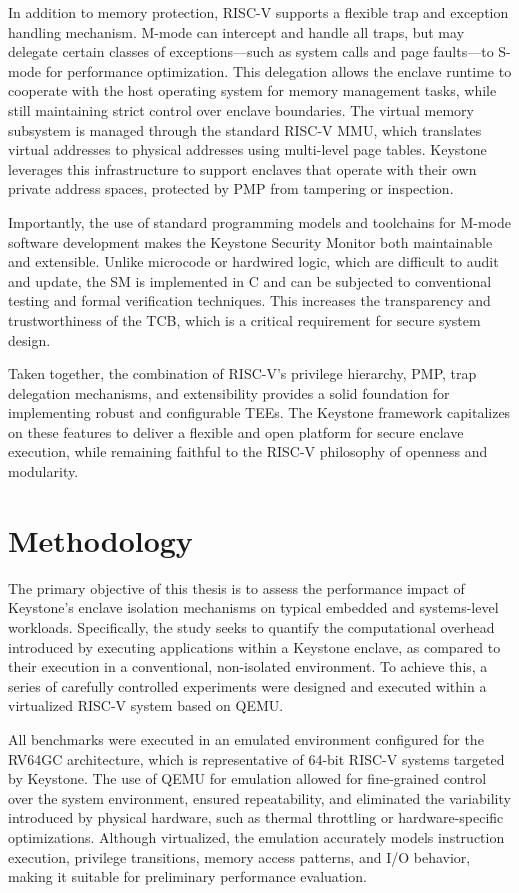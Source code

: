 \documentclass[english, version-2020-11]{uzl-thesis}
\begin{document}
In addition to memory protection, RISC-V supports a flexible trap and exception handling mechanism. M-mode can intercept and handle all traps, but may delegate certain classes of exceptions—such as system calls and page faults—to S-mode for performance optimization. This delegation allows the enclave runtime to cooperate with the host operating system for memory management tasks, while still maintaining strict control over enclave boundaries. The virtual memory subsystem is managed through the standard RISC-V MMU, which translates virtual addresses to physical addresses using multi-level page tables. Keystone leverages this infrastructure to support enclaves that operate with their own private address spaces, protected by PMP from tampering or inspection.

Importantly, the use of standard programming models and toolchains for M-mode software development makes the Keystone Security Monitor both maintainable and extensible. Unlike microcode or hardwired logic, which are difficult to audit and update, the SM is implemented in C and can be subjected to conventional testing and formal verification techniques. This increases the transparency and trustworthiness of the TCB, which is a critical requirement for secure system design.

Taken together, the combination of RISC-V’s privilege hierarchy, PMP, trap delegation mechanisms, and extensibility provides a solid foundation for implementing robust and configurable TEEs. The Keystone framework capitalizes on these features to deliver a flexible and open platform for secure enclave execution, while remaining faithful to the RISC-V philosophy of openness and modularity.



\chapter{Methodology}
The primary objective of this thesis is to assess the performance impact of Keystone’s enclave isolation mechanisms on typical embedded and systems-level workloads. Specifically, the study seeks to quantify the computational overhead introduced by executing applications within a Keystone enclave, as compared to their execution in a conventional, non-isolated environment. To achieve this, a series of carefully controlled experiments were designed and executed within a virtualized RISC-V system based on QEMU.

All benchmarks were executed in an emulated environment configured for the RV64GC architecture, which is representative of 64-bit RISC-V systems targeted by Keystone. The use of QEMU for emulation allowed for fine-grained control over the system environment, ensured repeatability, and eliminated the variability introduced by physical hardware, such as thermal throttling or hardware-specific optimizations. Although virtualized, the emulation accurately models instruction execution, privilege transitions, memory access patterns, and I/O behavior, making it suitable for preliminary performance evaluation.
\end{document}
